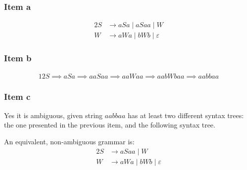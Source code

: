 \documentclass[docid=2018/19]{tcom_exam}
\begin{document}
{\subsubsection{Item a}
\begin{alignat*}{2}
	S &\rightarrow aSa\mid aSaa\mid W\\
	W &\rightarrow aWa\mid bWb\mid \varepsilon
\end{alignat*}
\subsubsection{Item b}
\begin{minipage}[c]{0.68\textwidth}
	\begin{alignat*}{12}
		S \implies aSa \implies aaSaa \implies aaWaa \implies aabWbaa \implies aabbaa
	\end{alignat*}
\end{minipage}
\begin{minipage}[c]{0.3\textwidth}
	\begin{center}
	\end{center}
\end{minipage}
\subsubsection{Item c}
Yes it is ambiguous, given string $aabbaa$ has at least two different syntax trees: the one presented in the previous item, and the following syntax tree.
\begin{center}
\end{center}
An equivalent, non-ambiguous grammar is:
\begin{alignat*}{2}
	S &\rightarrow aSaa\mid W\\
	W &\rightarrow aWa\mid bWb\mid \varepsilon
\end{alignat*}
}
\end{document}
